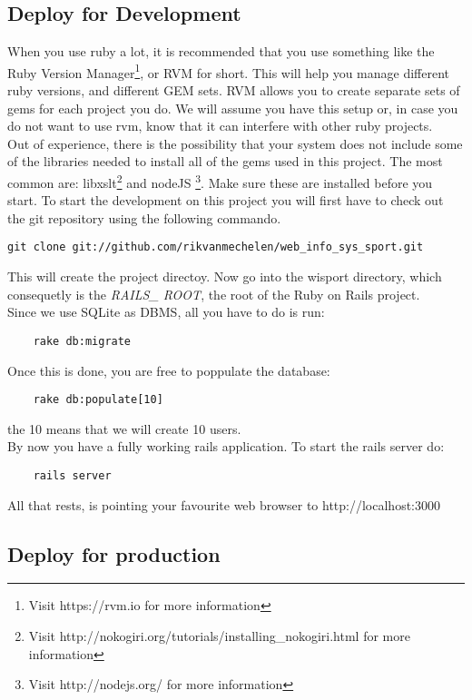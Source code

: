 \subsection{Deploy for Development}
When you use ruby a lot, it is recommended that you use something like the Ruby Version Manager\footnote{Visit https://rvm.io for more information}, or RVM for short. This will help you manage different ruby versions, and different GEM sets. RVM allows you to create separate sets of gems for each project you do. We will assume you have this setup or, in case you do not want to use rvm, know that it can interfere with other ruby projects.\\
Out of experience, there is the possibility that your system does not include some of the libraries needed to install all of the gems used in this project. The most common are: libxslt\footnote{Visit http://nokogiri.org/tutorials/installing_nokogiri.html for more information} and nodeJS \footnote{Visit http://nodejs.org/ for more information}. Make sure these are installed before you start.
To start the development on this project you will first have to check out the git repository using the following commando.
\begin{lstlisting}
git clone git://github.com/rikvanmechelen/web_info_sys_sport.git
\end{lstlisting}
This will create the project directoy. Now go into the wisport directory, which consequetly is the \textit{RAILS\_ ROOT}, the root of the Ruby on Rails project.\\
Since we use SQLite as DBMS, all you have to do is run:
\begin{lstlisting}
	rake db:migrate
\end{lstlisting}
Once this is done, you are free to poppulate the database: 
\begin{lstlisting}
	rake db:populate[10]
\end{lstlisting}
the 10 means that we will create 10 users.\\
By now you have a fully working rails application.
To start the rails server do:
\begin{lstlisting}
	rails server
\end{lstlisting}
All that rests, is pointing your favourite web browser to http://localhost:3000

\subsection{Deploy for production}
